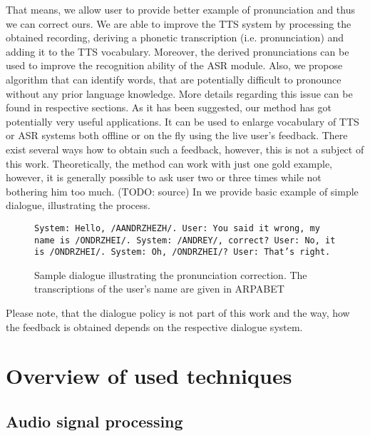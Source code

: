 That means, we allow user to provide better example of pronunciation and thus we can correct ours.
We are able to improve the TTS system by processing the obtained recording, deriving a phonetic transcription (i.e. pronunciation) and adding it to the TTS vocabulary.
Moreover, the derived pronunciations can be used to improve the recognition ability of the ASR module.
Also, we propose algorithm that can identify words, that are potentially difficult to pronounce without any prior language knowledge.
More details regarding this issue can be found in respective sections.
As it has been suggested, our method has got potentially very useful applications.
It can be used to enlarge vocabulary of TTS or ASR systems both offline or on the fly using the live user's feedback.
There exist several ways how to obtain such a feedback, however, this is not a subject of this work.
Theoretically, the method can work with just one gold example, however, it is generally possible to ask user two or three times while not bothering him too much. (TODO: source)
In  we provide basic example of simple dialogue, illustrating the process.\pagebreak
\begin{center}
\begin{figure}[h]
\texttt{System: Hello, /AANDRZHEZH/.\linebreak
User: You said it wrong, my name is /ONDRZHEI/.\linebreak
System: /ANDREY/, correct?\linebreak
User: No, it is /ONDRZHEI/.\linebreak
System: Oh, /ONDRZHEI/?\linebreak
User: That's right.
}
\caption{Sample dialogue illustrating the pronunciation correction. The transcriptions of the user's name are given in ARPABET\cite{Arpabet}}
\label{dialogsample}
\end{figure}
\end{center}
Please note, that the dialogue policy is not part of this work and the way, how the feedback is obtained depends on the respective dialogue system.

\section{Overview of used techniques}
\subsection{Audio signal processing}
